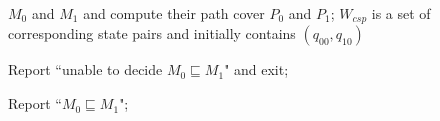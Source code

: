 \begin{algorithm}[!t] 
\scriptsize
{} %
$M_0$ and $M_1$ and compute their path cover $P_0$ and $P_1$;
$W_{csp}$ is a set of corresponding state pairs and initially
contains $(q_{00},q_{10})$\; 
{
	{ 
		Report ``unable to decide $M_0\sqsubseteq M_1$" and
		exit;	
	}			

} 
Report ``$M_0\sqsubseteq M_1$";\label{line:containmentsucc}
\caption{$\mathtt{containmentChecker}$($M_0$,$M_1$)} 
\label{Algo:Containment} 
\end{algorithm} 
